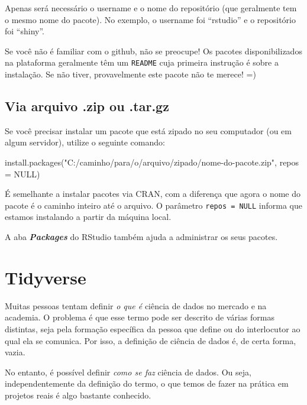 \documentclass[
]{book}
\newenvironment{Shaded}{\begin{snugshade}}{\end{snugshade}}
\newcommand{\AttributeTok}[1]{\textcolor[rgb]{0.77,0.63,0.00}{#1}}
\newcommand{\ConstantTok}[1]{\textcolor[rgb]{0.00,0.00,0.00}{#1}}
\newcommand{\FunctionTok}[1]{\textcolor[rgb]{0.00,0.00,0.00}{#1}}
\newcommand{\NormalTok}[1]{#1}
\newcommand{\StringTok}[1]{\textcolor[rgb]{0.31,0.60,0.02}{#1}}
\begin{document}
Apenas será necessário o username e o nome do repositório (que geralmente tem o mesmo nome do pacote). No exemplo, o username foi ``rstudio'' e o repositório foi ``shiny''.

Se você não é familiar com o github, não se preocupe! Os pacotes disponibilizados na plataforma geralmente têm um \texttt{README} cuja primeira instrução é sobre a instalação. Se não tiver, provavelmente este pacote não te merece! =)

\hypertarget{via-arquivo-.zip-ou-.tar.gz}{%
\subsection{Via arquivo .zip ou .tar.gz}\label{via-arquivo-.zip-ou-.tar.gz}}

Se você precisar instalar um pacote que está zipado no seu computador (ou em algum servidor), utilize o seguinte comando:

\begin{Shaded}
\begin{Highlighting}[]
\FunctionTok{install.packages}\NormalTok{(}\StringTok{"C:/caminho/para/o/arquivo/zipado/nome{-}do{-}pacote.zip"}\NormalTok{, }\AttributeTok{repos =} \ConstantTok{NULL}\NormalTok{)}
\end{Highlighting}
\end{Shaded}

É semelhante a instalar pacotes via CRAN, com a diferença que agora o nome do pacote é o caminho inteiro até o arquivo. O parâmetro \texttt{repos\ =\ NULL} informa que estamos instalando a partir da máquina local.

A aba \textbf{\emph{Packages}} do RStudio também ajuda a administrar os seus pacotes.

\hypertarget{tidyverse}{%
\section{Tidyverse}\label{tidyverse}}

Muitas pessoas tentam definir \emph{o que é} ciência de dados no mercado e na academia. O problema é que esse termo pode ser descrito de várias formas distintas, seja pela formação específica da pessoa que define ou do interlocutor ao qual ela se comunica. Por isso, a definição de ciência de dados é, de certa forma, vazia.

No entanto, é possível definir \emph{como se faz} ciência de dados. Ou seja, independentemente da definição do termo, o que temos de fazer na prática em projetos reais é algo bastante conhecido.
\end{document}
